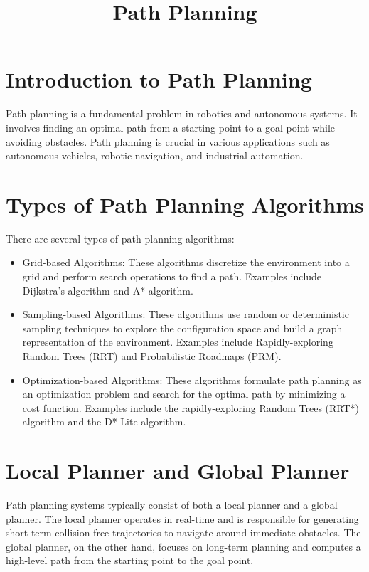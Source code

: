 \documentclass{article}
\title{\vspace{-2cm}Path Planning}
\date{}
\author{}
\begin{document}
\maketitle

\section*{Introduction to Path Planning}

Path planning is a fundamental problem in robotics and autonomous systems. It involves finding an optimal path from a starting point to a goal point while avoiding obstacles. Path planning is crucial in various applications such as autonomous vehicles, robotic navigation, and industrial automation.

\section*{Types of Path Planning Algorithms}

There are several types of path planning algorithms:

\begin{itemize}
  \item Grid-based Algorithms: These algorithms discretize the environment into a grid and perform search operations to find a path. Examples include Dijkstra's algorithm and A* algorithm.
  
  \item Sampling-based Algorithms: These algorithms use random or deterministic sampling techniques to explore the configuration space and build a graph representation of the environment. Examples include Rapidly-exploring Random Trees (RRT) and Probabilistic Roadmaps (PRM).
  
  \item Optimization-based Algorithms: These algorithms formulate path planning as an optimization problem and search for the optimal path by minimizing a cost function. Examples include the rapidly-exploring Random Trees (RRT*) algorithm and the D* Lite algorithm.
\end{itemize}

\section*{Local Planner and Global Planner}

Path planning systems typically consist of both a local planner and a global planner. The local planner operates in real-time and is responsible for generating short-term collision-free trajectories to navigate around immediate obstacles. The global planner, on the other hand, focuses on long-term planning and computes a high-level path from the starting point to the goal point.
\end{document}

